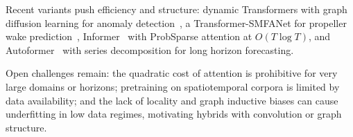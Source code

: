 \documentclass[journal]{IEEEtran}
\providecommand{\Description}[1]{}
\begin{document}
Recent variants push efficiency and structure: dynamic Transformers with graph diffusion learning for anomaly detection~\cite{yu2025graph}, a Transformer-SMFANet for propeller wake prediction~\cite{wang2025propeller}, Informer~\cite{zhou2021informer} with ProbSparse attention at $O(T \log T)$, and Autoformer~\cite{wu2021autoformer} with series decomposition for long horizon forecasting.
 
Open challenges remain: the quadratic cost of attention is prohibitive for very large domains or horizons; pretraining on spatiotemporal corpora is limited by data availability; and the lack of locality and graph inductive biases can cause underfitting in low data regimes, motivating hybrids with convolution or graph structure.
 
\end{document}
